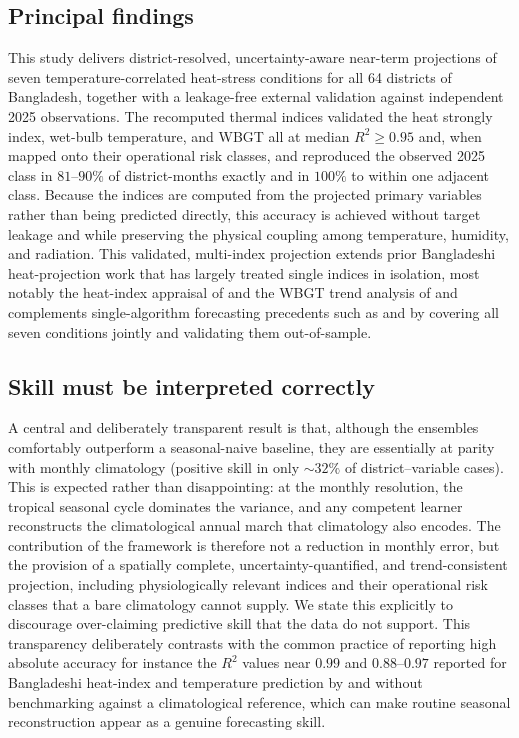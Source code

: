 \documentclass[review,11pt]{elsarticle}
\begin{document}
\subsection{Principal findings}
This study delivers district-resolved, uncertainty-aware near-term projections of
seven temperature-correlated heat-stress conditions for all 64 districts of
Bangladesh, together with a leakage-free external validation against independent
2025 observations. The recomputed thermal indices validated the heat strongly
index, wet-bulb temperature, and WBGT all at median $R^{2}\ge0.95$ and, when
mapped onto their operational risk classes, and reproduced the observed 2025 class in
$81$--$90\%$ of district-months exactly and in $100\%$ to within one adjacent
class. Because the indices are computed from the projected primary variables
rather than being predicted directly, this accuracy is achieved without target leakage
and while preserving the physical coupling among temperature, humidity, and
radiation. This validated, multi-index projection extends prior Bangladeshi
heat-projection work that has largely treated single indices in isolation, most
notably the heat-index appraisal of \citet{rahman2021} and the WBGT trend analysis
of \citet{kamal2024scientific} and complements single-algorithm forecasting
precedents such as \citet{mollah2026mlheatindex} and \citet{islam2026enso} by
covering all seven conditions jointly and validating them out-of-sample.

\subsection{Skill must be interpreted correctly}
A central and deliberately transparent result is that, although the ensembles
comfortably outperform a seasonal-naive baseline, they are essentially at parity
with monthly climatology (positive skill in only $\sim\!32\%$ of
district--variable cases). This is expected rather than disappointing: at the monthly
resolution, the tropical seasonal cycle dominates the variance, and any competent
learner reconstructs the climatological annual march that climatology also
encodes. The contribution of the framework is therefore not a reduction in
monthly error, but the provision of a spatially complete, uncertainty-quantified,
and trend-consistent projection, including physiologically relevant indices and
their operational risk classes that a bare climatology cannot supply. We state
this explicitly to discourage over-claiming predictive skill that the data do not
support. This transparency deliberately contrasts with the common practice of
reporting high absolute accuracy for instance the $R^{2}$ values near $0.99$ and
$0.88$--$0.97$ reported for Bangladeshi heat-index and temperature prediction by
\citet{mollah2026mlheatindex} and \citet{islam2026enso} without benchmarking
against a climatological reference, which can make routine seasonal reconstruction
appear as a genuine forecasting skill.
\end{document}
